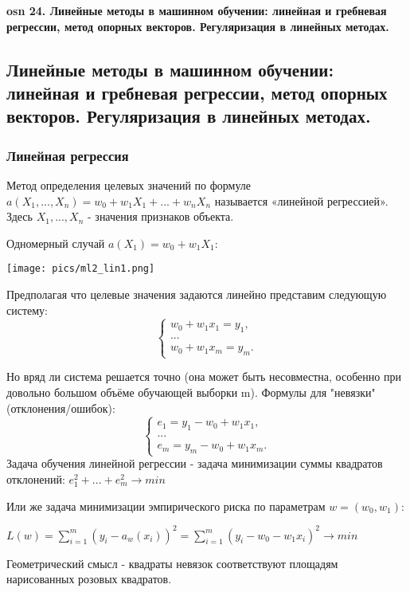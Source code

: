 \textbf{\LARGE osn 24. Линейные методы в машинном обучении: линейная и гребневая регрессии, метод опорных векторов. Регуляризация в линейных методах.}

\subsection{Линейные методы в машинном обучении: линейная и гребневая регрессии, метод опорных векторов. Регуляризация в линейных методах.}
\subsubsection{Линейная регрессия}
Метод определения целевых значений по формуле $a(X_1, ..., X_n) = w_0 + w_1X_1 + ... + w_nX_n$ называется «линейной регрессией». Здесь $X_1, ..., X_n$ - значения признаков объекта.

Одномерный случай $a(X_1) = w_0 + w_1X_1$:

\texttt{[image: pics/ml2\_lin1.png]}

Предполагая что целевые значения задаются линейно представим следующую систему:
\begin{equation*}
 \begin{cases}
   w_0 + w_1x_1 = y_1, 
   \\
   ...
   \\
   w_0 + w_1x_m = y_m.
 \end{cases}
\end{equation*}

Но вряд ли система решается точно (она может быть несовместна, особенно при довольно большом объёме обучающей выборки m).
Формулы для "невязки" (отклонения/ошибок):
\begin{equation*}
 \begin{cases}
   e_1 = y_1 - w_0 + w_1x_1, 
   \\
   ...
   \\
   e_m = y_m - w_0 + w_1x_m.
 \end{cases}
\end{equation*}
Задача обучения линейной регрессии - задача минимизации суммы квадратов
отклонений:
$e_1^2 + ... + e_m^2 \rightarrow min$

Или же задача минимизации эмпирического риска по параметрам $w=(w_0, w_1)$:

$L(w) = \sum\limits_{i=1}^m (y_i - a_w(x_i))^2 = \sum\limits_{i=1}^m (y_i - w_0 - w_1x_i)^2 \rightarrow min$

Геометрический смысл - квадраты невязок соответствуют площадям нарисованных розовых
квадратов.

